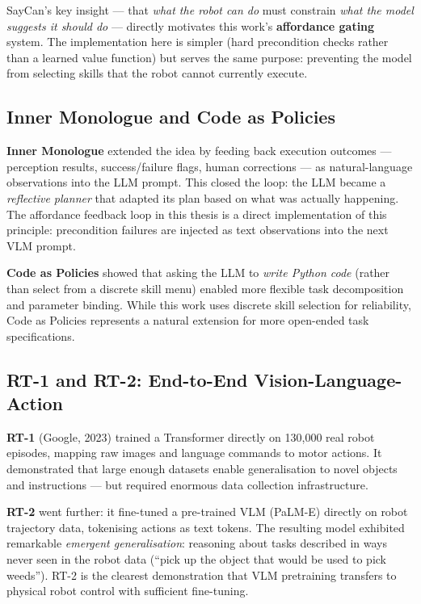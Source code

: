 SayCan's key insight --- that \emph{what the robot can do} must constrain \emph{what
the model suggests it should do} --- directly motivates this work's
\textbf{affordance gating} system.
The implementation here is simpler (hard precondition checks rather than a learned
value function) but serves the same purpose: preventing the model from selecting
skills that the robot cannot currently execute.

\subsection{Inner Monologue and Code as Policies}

\textbf{Inner Monologue} \cite{huang2022inner} extended the idea by feeding back
execution outcomes --- perception results, success/failure flags, human corrections
--- as natural-language observations into the LLM prompt.
This closed the loop: the LLM became a \emph{reflective planner} that adapted its
plan based on what was actually happening.
The affordance feedback loop in this thesis is a direct implementation of this
principle: precondition failures are injected as text observations into the next
VLM prompt.

\textbf{Code as Policies} \cite{liang2023code} showed that asking the LLM to
\emph{write Python code} (rather than select from a discrete skill menu) enabled
more flexible task decomposition and parameter binding.
While this work uses discrete skill selection for reliability, Code as Policies
represents a natural extension for more open-ended task specifications.

\subsection{RT-1 and RT-2: End-to-End Vision-Language-Action}

\textbf{RT-1} \cite{brohan2022rt1} (Google, 2023) trained a Transformer directly
on 130,000 real robot episodes, mapping raw images and language commands to motor
actions.
It demonstrated that large enough datasets enable generalisation to novel objects
and instructions --- but required enormous data collection infrastructure.

\textbf{RT-2} \cite{brohan2023rt2} went further: it fine-tuned a pre-trained VLM
(PaLM-E) directly on robot trajectory data, tokenising actions as text tokens.
The resulting model exhibited remarkable \emph{emergent generalisation}: reasoning
about tasks described in ways never seen in the robot data
(``pick up the object that would be used to pick weeds'').
RT-2 is the clearest demonstration that VLM pretraining transfers to physical robot
control with sufficient fine-tuning.

